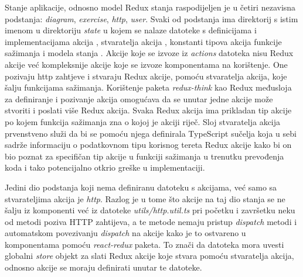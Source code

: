 \documentclass[times, utf8, diplomski, numeric]{fer}
\newcommand{\razmakp}{\vspace{18pt}}
\begin{document}
Stanje aplikacije, odnosno model Redux stanja raspodijeljen je u četiri nezavisna podstanja: \emph{diagram}, \emph{exercise}, \emph{http}, \emph{user}.
Svaki od podstanja ima direktorij s istim imenom u direktoriju \emph{state} u kojem se nalaze datoteke s definicijama i implementacijama akcija , stvaratelja akcija , konstanti tipova akcija  funkcije sažimanja  i modela stanja .
Akcije koje se izvoze iz \emph{actions} datoteka nisu Redux akcije već kompleksnije akcije koje se izvoze komponentama na korištenje.
One pozivaju http zahtjeve i stvaraju Redux akcije, pomoću stvaratelja akcija, koje šalju  funkcijama sažimanja.
Korištenje paketa \emph{redux-think} kao Redux međusloja za definiranje i pozivanje akcija omogućava da se unutar jedne akcije može stvoriti i poslati više Redux akcija.
Svaka Redux akcija ima prikladan tip akcije po kojem funkcija sažimanja zna o kojoj je akciji riječ.
Sloj stvaratelja akcija prvenstveno služi da bi se pomoću njega definirala TypeScript sučelja koja u sebi sadrže informaciju o podatkovnom tipu korisnog tereta  Redux akcije kako bi on bio poznat za specifičan tip akcije u funkciji sažimanja u trenutku prevođenja koda i tako potencijalno otkrio greške u implementaciji.

Jedini dio podstanja koji nema definiranu datoteku s akcijama, već samo sa stvarateljima akcija je \emph{http}.
Razlog je u tome što akcije na taj dio stanja se ne šalju iz komponenti već iz datoteke \emph{utils/http.util.ts} pri početku i završetku neku od metodi poziva HTTP zahtijeva, a te metode nemaju pristup \emph{dispatch} metodi i automatskom povezivanju \emph{dispatch} na akcije kako je to ostvareno u komponentama pomoću \emph{react-redux} paketa. To znači da datoteka mora uvesti globalni \emph{store} objekt za slati Redux akcije koje stvara pomoću stvaratelja akcija, odnosno akcije se moraju definirati unutar te datoteke.

\razmakp
\end{document}
